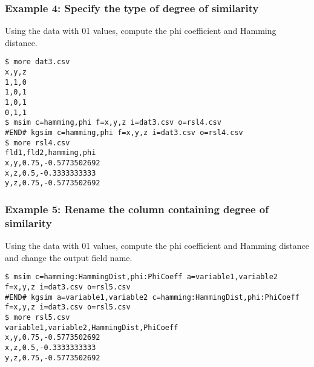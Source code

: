 \subsubsection*{Example 4: Specify the type of degree of similarity}

Using the data with 01 values, compute the phi coefficient and Hamming distance.


\begin{Verbatim}[baselinestretch=0.7,frame=single]
$ more dat3.csv
x,y,z
1,1,0
1,0,1
1,0,1
0,1,1
$ msim c=hamming,phi f=x,y,z i=dat3.csv o=rsl4.csv
#END# kgsim c=hamming,phi f=x,y,z i=dat3.csv o=rsl4.csv
$ more rsl4.csv
fld1,fld2,hamming,phi
x,y,0.75,-0.5773502692
x,z,0.5,-0.3333333333
y,z,0.75,-0.5773502692
\end{Verbatim}
\subsubsection*{Example 5: Rename the column containing degree of similarity}

Using the data with 01 values, compute the phi coefficient and Hamming distance and change the output field name.


\begin{Verbatim}[baselinestretch=0.7,frame=single]
$ msim c=hamming:HammingDist,phi:PhiCoeff a=variable1,variable2 f=x,y,z i=dat3.csv o=rsl5.csv
#END# kgsim a=variable1,variable2 c=hamming:HammingDist,phi:PhiCoeff f=x,y,z i=dat3.csv o=rsl5.csv
$ more rsl5.csv
variable1,variable2,HammingDist,PhiCoeff
x,y,0.75,-0.5773502692
x,z,0.5,-0.3333333333
y,z,0.75,-0.5773502692
\end{Verbatim}
